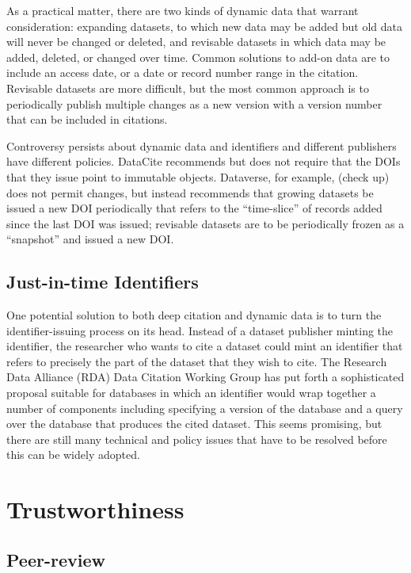 \documentclass[10pt,a4paper,twocolumn]{article}
\begin{document}
As a practical matter, there are two kinds of dynamic data that warrant consideration: expanding datasets, to which new data may be added but old data will never be changed or deleted, and revisable datasets in which data may be added, deleted, or changed over time. 
Common solutions to add-on data are to include an access date, or a date or record number range in the citation. 
Revisable datasets are more difficult, but the most common approach is to periodically publish multiple changes as a new version with a version number that can be included in citations.

Controversy persists about dynamic data and identifiers and different publishers have different policies. 
DataCite recommends but does not require that the DOIs that they issue point to immutable objects. 
Dataverse, for example, (check up) does not permit changes, but instead recommends that growing datasets be issued a new DOI periodically that refers to the ``time-slice'' of records added since the last DOI was issued; revisable datasets are to be periodically frozen as a ``snapshot'' and issued a new DOI.

\subsection*{Just-in-time Identifiers}\label{just-in-time-identifiers}

One potential solution to both deep citation and dynamic data is to turn the identifier-issuing process on its head. 
Instead of a dataset publisher minting the identifier, the researcher who wants to cite a dataset could mint an identifier that refers to precisely the part of the dataset that they wish to cite. 
The Research Data Alliance (RDA) Data Citation Working Group has put forth a sophisticated proposal suitable for databases in which an identifier would wrap together a number of components including specifying a version of the database and a query over the database that produces the cited dataset. 
This seems promising, but there are still many technical and policy issues that have to be resolved before this can be widely adopted.

\section*{Trustworthiness}\label{trustworthiness}

\subsection*{Peer-review}\label{peer-review}
\end{document}
